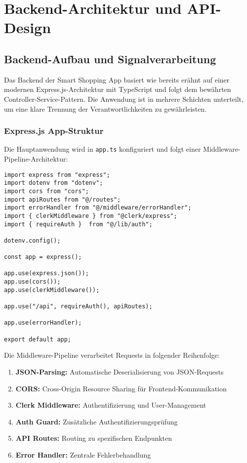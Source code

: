 \chapter{Backend-Architektur und API-Design}
\renewcommand{\authorinitials}{MT}
\label{chap:backend}

\section{Backend-Aufbau und Signalverarbeitung}

Das Backend der Smart Shopping App basiert wie bereits erähnt auf einer modernen Express.js-Architektur mit TypeScript und folgt dem bewährten Controller-Service-Pattern. Die Anwendung ist in mehrere Schichten unterteilt, um eine klare Trennung der Verantwortlichkeiten zu gewährleisten.

\subsection{Express.js App-Struktur}

Die Hauptanwendung wird in \texttt{app.ts} konfiguriert und folgt einer Middleware-Pipeline-Architektur:

\begin{lstlisting}[style=typescriptstyle,caption={Express.js App-Konfiguration}]
import express from "express";
import dotenv from "dotenv";
import cors from "cors";
import apiRoutes from "@/routes";
import errorHandler from "@/middleware/errorHandler";
import { clerkMiddleware } from "@clerk/express";
import { requireAuth }  from "@/lib/auth";

dotenv.config();

const app = express();

app.use(express.json());
app.use(cors());
app.use(clerkMiddleware());

app.use("/api", requireAuth(), apiRoutes);

app.use(errorHandler);

export default app;
\end{lstlisting}

Die Middleware-Pipeline verarbeitet Requests in folgender Reihenfolge:
\begin{enumerate}
    \item \textbf{JSON-Parsing:} Automatische Deserialisierung von JSON-Requests
    \item \textbf{CORS:} Cross-Origin Resource Sharing für Frontend-Kommunikation
    \item \textbf{Clerk Middleware:} Authentifizierung und User-Management
    \item \textbf{Auth Guard:} Zusätzliche Authentifizierungsprüfung
    \item \textbf{API Routes:} Routing zu spezifischen Endpunkten
    \item \textbf{Error Handler:} Zentrale Fehlerbehandlung
\end{enumerate}


